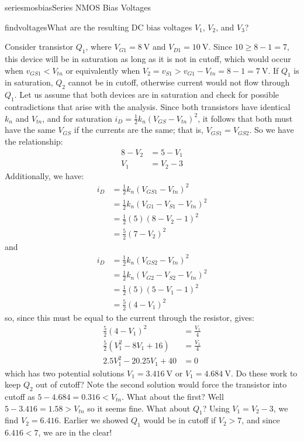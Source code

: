 \begin{mainquestion}{seriesmosbias}{Series NMOS Bias Voltages}
\begin{partquestion}{findvoltages}{What are the resulting DC bias voltages $V_{1}$, $V_{2}$, and $V_{3}$?}
\begin{answer}
Consider transistor $Q_{1}$, where $V_{G1} = \qty{8}{\volt}$ and $V_{D1} = \qty{10}{\volt}$. Since $10 \geq 8 - 1 = 7$, this device will be in saturation as long as it is not in cutoff, which would occur when $v_{GS1} < V_{tn}$ or equivalently when $V_{2} = v_{S1} > v_{G1} - V_{tn} = 8 - 1 = \qty{7}{\volt}$. If $Q_{1}$ is in saturation, $Q_{2}$ cannot be in cutoff, otherwise current would not flow through $Q_{1}$. Let us assume that both devices are in saturation and check for possible contradictions that arise with the analysis. Since both transistors have identical $k_{n}$ and $V_{tn}$, and for saturation $i_{D} = \frac{1}{2}k_{n}\left(V_{GS} - V_{tn} \right)^{2}$, it follows that both must have the same $V_{GS}$ if the currents are the same; that is, $V_{GS1} = V_{GS2}$. So we have the relationship:
\begin{align*}
    8 - V_2 &= 5 - V_1 \\
    V_1 &= V_2 - 3
\end{align*}
Additionally, we have:
\begin{align*}
    i_D &= \frac{1}{2} k_n (V_{GS1} - V_{tn})^2 \\
    &= \frac{1}{2} k_n (V_{G1} - V_{S1} - V_{tn})^2 \\
    &= \frac{1}{2} (5) (8 - V_2 - 1)^2 \\
    &= \frac{5}{2} (7 - V_2)^2
\end{align*}
and
\begin{align*}
    i_D &= \frac{1}{2} k_n (V_{GS2} - V_{tn})^2 \\
    &= \frac{1}{2} k_n (V_{G2} - V_{S2} - V_{tn})^2 \\
    &= \frac{1}{2} (5) (5 - V_1 - 1)^2 \\
    &= \frac{5}{2} (4 - V_1)^2
\end{align*}
so, since this must be equal to the current through the resistor, gives:
\begin{align*}
    \frac{5}{2} (4 - V_1)^2 &= \frac{V_1}{4} \\
    \frac{5}{2} (V_1^2 - 8V_1 +16) &= \frac{V_1}{4} \\
    2.5V_1^2 - 20.25V_1 + 40 &= 0
\end{align*}
which has two potential solutions $V_{1} = \qty{3.416}{\volt}$ or $V_{1} = \qty{4.684}{\volt}$. Do these work to keep $Q_2$ out of cutoff? Note the second solution would force the transistor into cutoff as $5 - 4.684 = 0.316 < V_{tn}$. What about the first? Well $5 - 3.416 = 1.58 > V_{tn}$ so it seems fine. What about $Q_1$? Using $V_1 = V_2 - 3$, we find $V_2 = 6.416$. Earlier we showed $Q_1$ would be in cutoff if $V_2 > 7$, and since $6.416 < 7$, we are in the clear!


\end{answer}
\end{partquestion}
\end{mainquestion}
